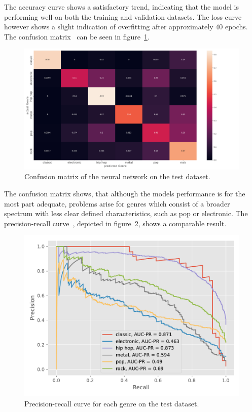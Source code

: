 \documentclass[
  12pt,
  bibliography=totoc,     %
  captions=tableheading,  %
  titlepage=firstiscover, %
]{scrartcl}
\begin{document}
\FloatBarrier
\noindent
The accuracy curve shows a satisfactory trend, indicating that the model is performing well on both the training and validation datasets. The loss curve however
shows a slight indication of overfitting after approximately $40$ epochs.
The confusion matrix~\cite{geron} can be seen in figure~\ref{fig:nn_confusion}.
\begin{figure}[H]
  \centering
  \includegraphics[scale=0.3]{figures/NN/confusion_matrix_nn.png}
  \caption{Confusion matrix of the neural network on the test dataset.}
  \label{fig:nn_confusion}
\end{figure}
\noindent
The confusion matrix shows, that although the models performance is for the most part adequate, problems arise for genres which consist of a broader spectrum with less clear
defined characteristics, such as pop or electronic.
The precision-recall curve~\cite{geron}, depicted in figure~\ref{fig:pr_curve_nn}, shows a comparable result.
\begin{figure}[H]
  \centering
  \includegraphics[scale=0.6]{figures/NN/PR_curve_genres.pdf}
  \caption{Precision-recall curve for each genre on the test dataset.}
  \label{fig:pr_curve_nn}
\end{figure}
\end{document}
